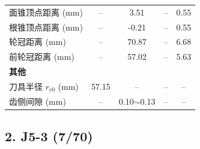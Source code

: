 ﻿\documentclass{article}
\begin{document}
\begin{table}[htbp]
\begin{tabular}{@{}lcccc@{}}
面锥顶点距离 (mm) & -- & 3.51 & -- & 0.55 \\
根锥顶点距离 (mm) & -- & -0.21 & -- & 0.55 \\
轮冠距离 (mm) & -- & 70.87 & -- & 6.68 \\
前轮冠距离 (mm) & -- & 57.02 & -- & 5.63 \\
\midrule
\multicolumn{5}{l}{\textbf{其他}} \\
刀具半径 $r_{c0}$ (mm) & 57.15 & -- & -- & -- \\
齿侧间隙 (mm) & -- & 0.10$\sim$0.13 & -- & -- \\
\bottomrule
\end{tabular}
\end{table}

\subsection*{2. J5-3 (7/70)}
\end{document}
